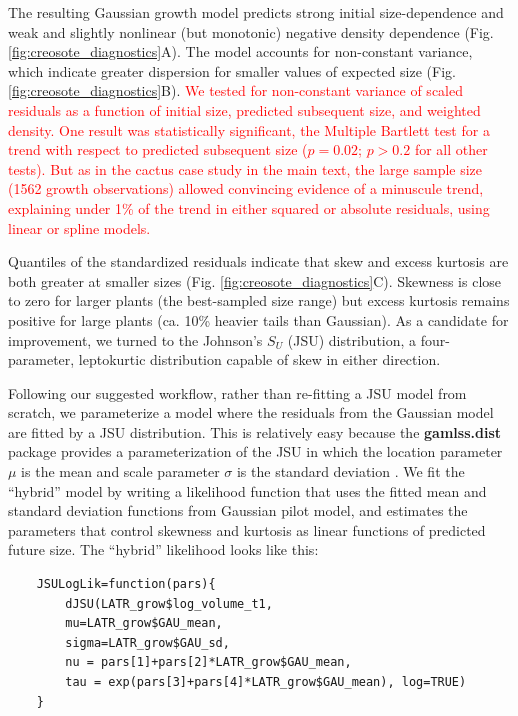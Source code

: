 \documentclass[12pt]{article}
\newcommand{\new}{\textcolor{red}}
\begin{document}
The resulting Gaussian growth model predicts strong initial size-dependence and weak and slightly nonlinear (but monotonic) negative density dependence (Fig. \ref{fig:creosote_diagnostics}A). 
The model accounts for non-constant variance, which indicate greater dispersion for smaller values of expected size (Fig. \ref{fig:creosote_diagnostics}B). 
\new{We tested for non-constant variance of scaled residuals as a function of initial size, predicted subsequent size, and weighted density. One result was statistically significant, 
the Multiple Bartlett test for a trend with respect to predicted subsequent size ($p = 0.02$; $p>0.2$ for all other tests). But as in the cactus case study in the main text, the large sample size
(1562 growth observations) allowed convincing evidence of a minuscule trend, explaining under 1\% of the trend in either squared or absolute residuals, using linear or spline models.} 
 
Quantiles of the standardized residuals indicate that skew and excess kurtosis are both greater at smaller sizes (Fig. \ref{fig:creosote_diagnostics}C).
Skewness is close to zero for larger plants (the best-sampled size range) but excess kurtosis remains positive for large plants (ca. 10\% heavier tails than Gaussian). 
As a candidate for improvement, we turned to the Johnson's $S_{U}$ (JSU) distribution, a four-parameter, leptokurtic distribution capable of skew in either direction. 

Following our suggested workflow, rather than re-fitting a JSU model from scratch, we parameterize a model where the residuals from the Gaussian model are fitted by a JSU distribution. 
This is relatively easy because the \textbf{gamlss.dist} package provides a parameterization of the JSU in which the location parameter $\mu$ is the mean and scale parameter $\sigma$ is the standard deviation \citep{rigby2019distributions}. 
We fit the ``hybrid'' model by writing a likelihood function that uses the fitted mean and standard deviation functions from Gaussian pilot model, and estimates the parameters that control skewness and kurtosis as linear functions of predicted future size.   
The ``hybrid'' likelihood looks like this:
\begin{lstlisting}
	JSULogLik=function(pars){
		dJSU(LATR_grow$log_volume_t1, 
		mu=LATR_grow$GAU_mean,
		sigma=LATR_grow$GAU_sd,
		nu = pars[1]+pars[2]*LATR_grow$GAU_mean,
		tau = exp(pars[3]+pars[4]*LATR_grow$GAU_mean), log=TRUE)
	}
\end{lstlisting}
\end{document}

